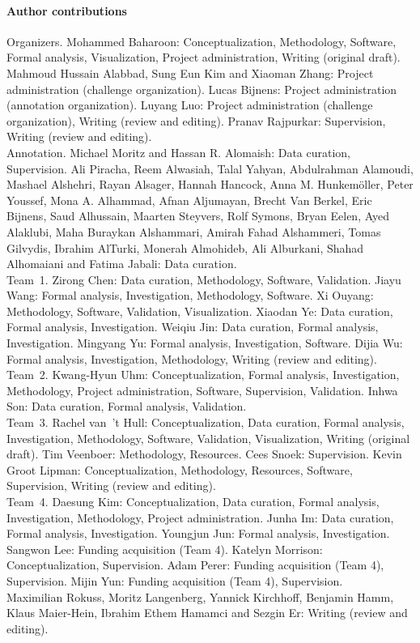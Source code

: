 \documentclass[final,5p,times,twocolumn,authoryear,numafflabel]{elsarticle}
\begin{document}
\paragraph{Author contributions}
Organizers. Mohammed Baharoon: Conceptualization, Methodology, Software, Formal analysis, Visualization, Project administration, Writing (original draft). Mahmoud Hussain Alabbad, Sung Eun Kim and Xiaoman Zhang: Project administration (challenge organization). Lucas Bijnens: Project administration (annotation organization). Luyang Luo: Project administration (challenge organization), Writing (review and editing). Pranav Rajpurkar: Supervision, Writing (review and editing).\\
Annotation. Michael Moritz and Hassan R. Alomaish: Data curation, Supervision. Ali Piracha, Reem Alwasiah, Talal Yahyan, Abdulrahman Alamoudi, Mashael Alshehri, Rayan Alsager, Hannah Hancock, Anna M. Hunkemöller, Peter Youssef, Mona A. Alhammad, Afnan Aljumayan, Brecht Van Berkel, Eric Bijnens, Saud Alhussain, Maarten Steyvers, Rolf Symons, Bryan Eelen, Ayed Alaklubi, Maha Buraykan Alshammari, Amirah Fahad Alshammeri, Tomas Gilvydis, Ibrahim AlTurki, Monerah Almohideb, Ali Alburkani, Shahad Alhomaiani and Fatima Jabali: Data curation.\\
Team~1. Zirong Chen: Data curation, Methodology, Software, Validation. Jiayu Wang: Formal analysis, Investigation, Methodology, Software. Xi Ouyang: Methodology, Software, Validation, Visualization. Xiaodan Ye: Data curation, Formal analysis, Investigation. Weiqiu Jin: Data curation, Formal analysis, Investigation. Mingyang Yu: Formal analysis, Investigation, Software. Dijia Wu: Formal analysis, Investigation, Methodology, Writing (review and editing).\\
Team~2. Kwang-Hyun Uhm: Conceptualization, Formal analysis, Investigation, Methodology, Project administration, Software, Supervision, Validation. Inhwa Son: Data curation, Formal analysis, Validation.\\
Team~3. Rachel van~'t Hull: Conceptualization, Data curation, Formal analysis, Investigation, Methodology, Software, Validation, Visualization, Writing (original draft). Tim Veenboer: Methodology, Resources. Cees Snoek: Supervision. Kevin Groot Lipman: Conceptualization, Methodology, Resources, Software, Supervision, Writing (review and editing).\\
Team~4. Daesung Kim: Conceptualization, Data curation, Formal analysis, Investigation, Methodology, Project administration. Junha Im: Data curation, Formal analysis, Investigation. Youngjun Jun: Formal analysis, Investigation. Sangwon Lee: Funding acquisition (Team 4). Katelyn Morrison: Conceptualization, Supervision. Adam Perer: Funding acquisition (Team 4), Supervision. Mijin Yun: Funding acquisition (Team 4), Supervision.\\
Maximilian Rokuss, Moritz Langenberg, Yannick Kirchhoff, Benjamin Hamm, Klaus Maier-Hein, Ibrahim Ethem Hamamci and Sezgin Er: Writing (review and editing).
\end{document}
